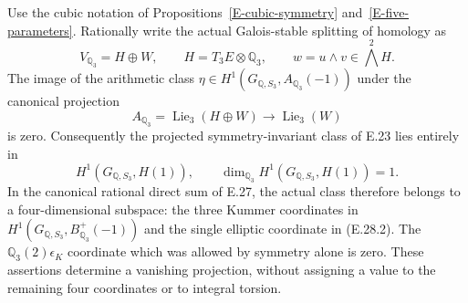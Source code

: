 \begin{proposition}
\label{E-no-pure-boundary-cubic}
Use the cubic notation of Propositions~\ref{E-cubic-symmetry}
and~\ref{E-five-parameters}. Rationally write the actual
Galois-stable splitting of homology as
\[
 V_{\mathbb Q_3}=H\oplus W,
 \qquad H=T_3E\otimes\mathbb Q_3,
 \qquad w=u\wedge v\in\bigwedge^2H.
\]
The image of the arithmetic class
$\eta\in H^1(G_{\mathbb Q,S_3},A_{\mathbb Q_3}(-1))$
under the canonical projection
\[
 A_{\mathbb Q_3}=\operatorname{Lie}_3(H\oplus W)
                  \longrightarrow\operatorname{Lie}_3(W)
 \tag{E.28.1}
\]
is zero. Consequently the projected symmetry-invariant class
of E.23 lies entirely in
\[
 H^1(G_{\mathbb Q,S_3},H(1)),
 \qquad \dim_{\mathbb Q_3}H^1(G_{\mathbb Q,S_3},H(1))=1.
 \tag{E.28.2}
\]
In the canonical rational direct sum of E.27, the actual
class therefore belongs to a four-dimensional subspace:
the three Kummer coordinates in
$H^1(G_{\mathbb Q,S_3},B^+_{\mathbb Q_3}(-1))$
and the single elliptic coordinate in (E.28.2).
The $\mathbb Q_3(2)\epsilon_K$ coordinate which was allowed
by symmetry alone is zero. These assertions determine a
vanishing projection, without assigning a value to the
remaining four coordinates or to integral torsion.
\end{proposition}
